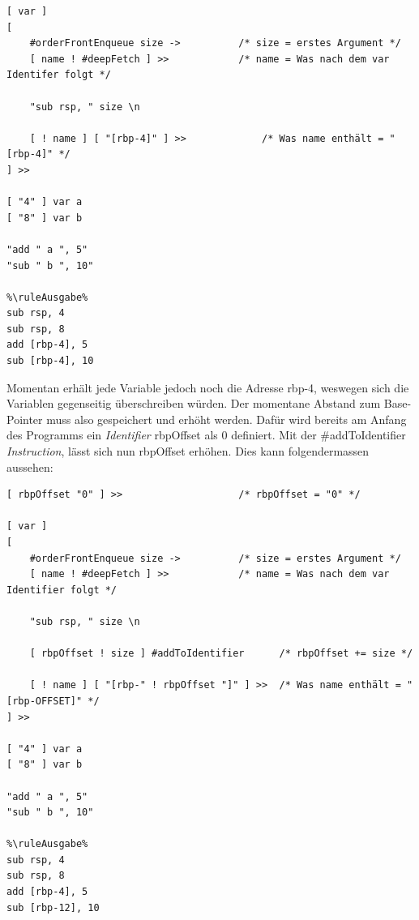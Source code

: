 \begin{lstlisting}[language=QHS, caption=Definition einer Variable mit {\selectListingFont var} \textit{Identifier}]
%\ruleEingabe%
[ var ]
[
    #orderFrontEnqueue size ->          /* size = erstes Argument */
    [ name ! #deepFetch ] >>            /* name = Was nach dem var Identifer folgt */

    "sub rsp, " size \n

    [ ! name ] [ "[rbp-4]" ] >>             /* Was name enthält = "[rbp-4]" */
] >> 

[ "4" ] var a 
[ "8" ] var b 

"add " a ", 5"
"sub " b ", 10"
    
%\ruleAusgabe%
sub rsp, 4
sub rsp, 8
add [rbp-4], 5
sub [rbp-4], 10
\end{lstlisting}

Momentan erhält jede Variable jedoch noch die Adresse {\selectListingFont rbp-4}, weswegen sich die Variablen gegenseitig überschreiben würden. Der momentane Abstand zum Base-Pointer muss also gespeichert und erhöht werden.
Dafür wird bereits am Anfang des Programms ein \textit{Identifier} {\selectListingFont rbpOffset} als 0 definiert.
Mit der {\listingFont\selectfont \#addToIdentifier} \textit{Instruction}, lässt sich nun {\selectListingFont rbpOffset} erhöhen. Dies kann folgendermassen aussehen:

\begin{minipage}{\linewidth}
\begin{lstlisting}[language=QHS, label=eg:qhs-vardefinition, caption=Definition einer Variable mit rbpOffset]
%\ruleEingabe%
[ rbpOffset "0" ] >>                    /* rbpOffset = "0" */

[ var ]
[
    #orderFrontEnqueue size ->          /* size = erstes Argument */
    [ name ! #deepFetch ] >>            /* name = Was nach dem var Identifier folgt */

    "sub rsp, " size \n

    [ rbpOffset ! size ] #addToIdentifier      /* rbpOffset += size */

    [ ! name ] [ "[rbp-" ! rbpOffset "]" ] >>  /* Was name enthält = "[rbp-OFFSET]" */
] >> 

[ "4" ] var a 
[ "8" ] var b 

"add " a ", 5"
"sub " b ", 10"
    
%\ruleAusgabe%
sub rsp, 4
sub rsp, 8
add [rbp-4], 5
sub [rbp-12], 10
\end{lstlisting}
\end{minipage}

